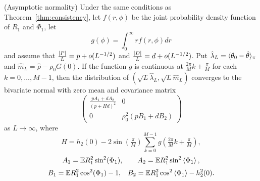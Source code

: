 \documentclass[journal]{IEEEtran}
\begin{document}
\begin{theorem}\label{thm:normality} (Asymptotic normality)
Under the same conditions as Theorem~\ref{thm:consistency}, let $f(r,\phi)$ be the joint probability density function of $R_1$ and $\Phi_1$, let
\[
g(\phi) = \int_{0}^{\infty} r f(r,\phi) dr %
\]
and assume that $\frac{{\left\vert P \right\vert}}{L} = p + o(L^{-1/2})$ and $\frac{{\left\vert D \right\vert}}{L} = d + o(L^{-1/2})$.
Put $\hat{\lambda}_L = \langle \theta_0 - \hat{\theta} \rangle_\pi$ and $\hat{m}_L = \hat{\rho} - \rho_0 G(0)$. %
If the function $g$ is continuous at $\tfrac{2\pi}{M}k + \tfrac{\pi}{M}$ for each $k = 0, \dots, M-1$, then the distribution of $(\sqrt{L}\hat{\lambda}_L, \sqrt{L}\hat{m}_L)$ converges to the bivariate normal with zero mean and covariance matrix
\[
\left( \begin{array}{cc} 
\frac{pA_1 + dA_2}{(p + H d)^2} & 0 \\
0 & \rho_0^2(pB_1 + dB_2)
\end{array} \right)
\]
as $L \rightarrow \infty$, where
\[
H = h_2(0) -  2 \sin(\tfrac{\pi}{M}) \sum_{k = 0}^{M-1} g(\tfrac{2\pi}{M}k + \tfrac{\pi}{M}),
\]
\[
A_1 = {\mathbb E} R_1^2\sin^2(\Phi_1), \qquad A_2 = {\mathbb E} R_1^2\sin^2\left\langle \Phi_1 \right\rangle,
\]
\[
B_1 = {\mathbb E} R_1^2 \cos^2(\Phi_1) - 1, \;\;\; B_2 = {\mathbb E} R_1^2 \cos^2\left\langle \Phi_1 \right\rangle - h_2^2(0).
\]
\end{theorem}

\end{document}
